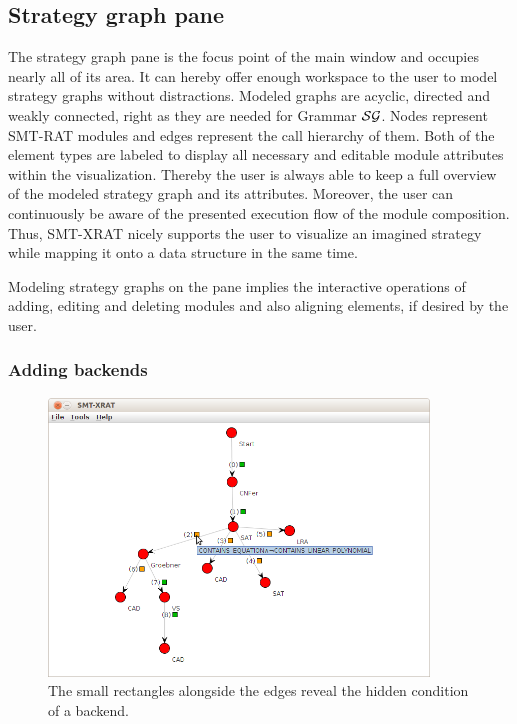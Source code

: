 \subsection{Strategy graph pane}
\label{sec:the_strategy_graph_pane}
The strategy graph pane is the focus point of the main window and occupies nearly all of its area. It can hereby offer enough workspace to the user to model strategy graphs without distractions. Modeled graphs are acyclic, directed and weakly connected, right as they are needed for Grammar ${\cal SG}$. Nodes represent SMT-RAT modules and edges represent the call hierarchy of them. Both of the element types are labeled to display all necessary and editable module attributes within the visualization. Thereby the user is always able to keep a full overview of the modeled strategy graph and its attributes. Moreover, the user can continuously be aware of the presented execution flow of the module composition. Thus, SMT-XRAT nicely supports the user to visualize an imagined strategy while mapping it onto a data structure in the same time.

Modeling strategy graphs on the pane implies the interactive operations of adding, editing and deleting modules and also aligning elements, if desired by the user.

\subsubsection{Adding backends}
\label{sec:adding_backends}
\begin{figure}
  \begin{center}
    \includegraphics[width=0.9\textwidth]{graphics/smt-xrat_condition_ttt.png}
  \end{center}
  \caption{The small rectangles alongside the edges reveal the hidden condition of a backend.}
  \label{fig:smt-xrat_condition_ttt}
\end{figure}

